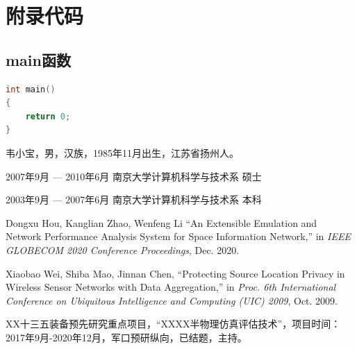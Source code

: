 \documentclass[winfonts,phd,twoside]{njuthesis}
\begin{document}
\begin{acknowledgement}
\lipsum[1]

\end{acknowledgement}








\appendix
\chapter{附录代码}\label{app:1}
\section{main函数}
\begin{lstlisting}[language=C]
int main()
{
	return 0;
}
\end{lstlisting}

\backmatter
\begin{resume}
\begin{authorinfo}
\noindent 韦小宝，男，汉族，1985年11月出生，江苏省扬州人。
\end{authorinfo}
\begin{education}
\item[2007年9月 --- 2010年6月] 南京大学计算机科学与技术系 \hfill 硕士
\item[2003年9月 --- 2007年6月] 南京大学计算机科学与技术系 \hfill 本科
\end{education}
\begin{publications}
\item Dongxu Hou, Kanglian Zhao, Wenfeng Li ``An Extensible Emulation and Network Performance Analysis System for Space Information Network,'' in \textsl{IEEE GLOBECOM 2020 Conference Proceedings}, Dec. 2020.
\item Xiaobao Wei, Shiba Mao, Jinnan Chen, ``Protecting Source Location Privacy
  in Wireless Sensor Networks with Data Aggregation,'' in \textsl{Proc. 6th
    International Conference on Ubiquitous Intelligence and Computing (UIC)
    2009}, Oct. 2009.
\end{publications}
\begin{projects}
\item XX十三五装备预先研究重点项目，“XXXX半物理仿真评估技术”，项目时间：2017年9月-2020年12月，军口预研纵向，已结题，主持。
\end{projects}
\end{resume}

\makelicense

\end{document}
